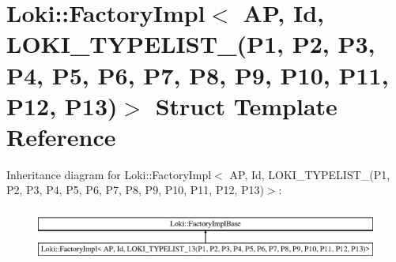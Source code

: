 \hypertarget{structLoki_1_1FactoryImpl_3_01AP_00_01Id_00_01LOKI__TYPELIST__13_07P1_00_01P2_00_01P3_00_01P4_00247c15bcbc98870388f2510cb34a203f}{}\section{Loki\+:\+:Factory\+Impl$<$ A\+P, Id, L\+O\+K\+I\+\_\+\+T\+Y\+P\+E\+L\+I\+S\+T\+\_(P1, P2, P3, P4, P5, P6, P7, P8, P9, P10, P11, P12, P13)$>$ Struct Template Reference}
\label{structLoki_1_1FactoryImpl_3_01AP_00_01Id_00_01LOKI__TYPELIST__13_07P1_00_01P2_00_01P3_00_01P4_00247c15bcbc98870388f2510cb34a203f}
Inheritance diagram for Loki\+:\+:Factory\+Impl$<$ A\+P, Id, L\+O\+K\+I\+\_\+\+T\+Y\+P\+E\+L\+I\+S\+T\+\_(P1, P2, P3, P4, P5, P6, P7, P8, P9, P10, P11, P12, P13)$>$\+:\begin{figure}[H]
\begin{center}
\leavevmode
\includegraphics[height=1.774960cm]{structLoki_1_1FactoryImpl_3_01AP_00_01Id_00_01LOKI__TYPELIST__13_07P1_00_01P2_00_01P3_00_01P4_00247c15bcbc98870388f2510cb34a203f}
\end{center}
\end{figure}
